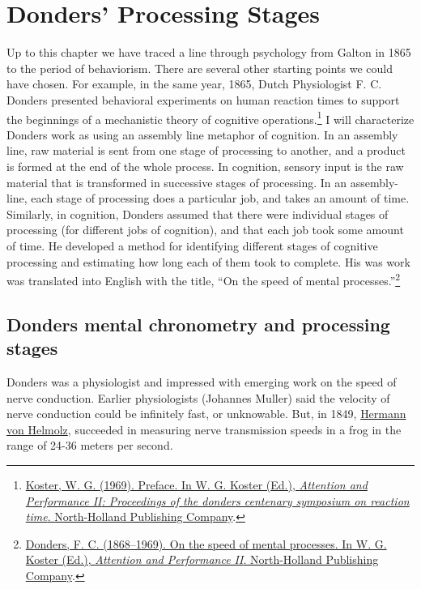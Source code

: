 \documentclass[
  oneside,
  12pt]{crumpbook}
\begin{document}
\hypertarget{donders-processing-stages}{%
\section{Donders' Processing Stages}\label{donders-processing-stages}}

Up to this chapter we have traced a line through psychology from Galton in 1865 to the period of behaviorism. There are several other starting points we could have chosen. For example, in the same year, 1865, Dutch Physiologist F. C. Donders presented behavioral experiments on human reaction times to support the beginnings of a mechanistic theory of cognitive operations.\footnote{\protect\hyperlink{ref-kosterPreface1969}{Koster, W. G. (1969). Preface. In W. G. Koster (Ed.), \emph{Attention and {Performance II}: Proceedings of the donders centenary symposium on reaction time}. {North-Holland Publishing Company}}.} I will characterize Donders work as using an assembly line metaphor of cognition. In an assembly line, raw material is sent from one stage of processing to another, and a product is formed at the end of the whole process. In cognition, sensory input is the raw material that is transformed in successive stages of processing. In an assembly-line, each stage of processing does a particular job, and takes an amount of time. Similarly, in cognition, Donders assumed that there were individual stages of processing (for different jobs of cognition), and that each job took some amount of time. He developed a method for identifying different stages of cognitive processing and estimating how long each of them took to complete. His was work was translated into English with the title, ``On the speed of mental processes.''\footnote{\protect\hyperlink{ref-dondersSpeedMentalProcesses1868}{Donders, F. C. (1868--1969). On the speed of mental processes. In W. G. Koster (Ed.), \emph{Attention and {Performance II}}. {North-Holland Publishing Company}}.}

\hypertarget{donders-mental-chronometry-and-processing-stages}{%
\subsection{Donders mental chronometry and processing stages}\label{donders-mental-chronometry-and-processing-stages}}

Donders was a physiologist and impressed with emerging work on the speed of nerve conduction. Earlier physiologists (Johannes Muller) said the velocity of nerve conduction could be infinitely fast, or unknowable. But, in 1849, \href{https://en.wikipedia.org/wiki/Hermann_von_Helmholtz}{Hermann von Helmolz}, succeeded in measuring nerve transmission speeds in a frog in the range of 24-36 meters per second.
\end{document}
